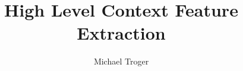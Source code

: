 \documentclass[master,english]{hgbthesis}
\title{High Level Context Feature Extraction}
\author{Michael Troger}
\begin{document}

\frontmatter							%

\maketitle
\tableofcontents


%			

\mainmatter          			%


%
%
%
%
%
%
%



\MakeBibliography                        				%



\end{document}
